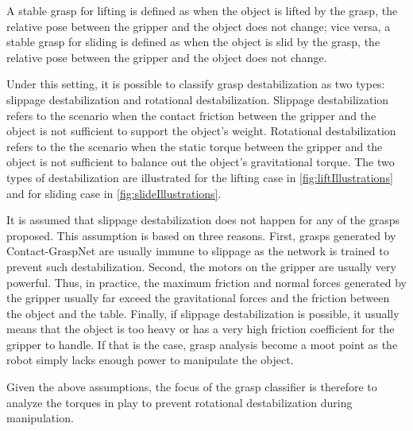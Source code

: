 \documentclass[12pt]{ucsddissertation}
\begin{document}
A stable grasp for lifting is defined as when the object is lifted by the grasp, the relative pose between the gripper and the object does not change; vice versa, a stable grasp for sliding is defined as when the object is slid by the grasp, the relative pose between the gripper and the object does not change. 

Under this setting, it is possible to classify grasp destabilization as two types: slippage destabilization and rotational destabilization. Slippage destabilization refers to the scenario when the contact friction between the gripper and the object is not sufficient to support the object's weight. Rotational destabilization refers to the the scenario when the static torque between the gripper and the object is not sufficient to balance out the object's gravitational torque. The two types of destabilization are illustrated for the lifting case in \ref{fig:liftIllustrations} and for sliding case in \ref{fig:slideIllustrations}. 

It is assumed that slippage destabilization does not happen for any of the grasps proposed. This assumption is based on three reasons. First, grasps generated by Contact-GraspNet are usually immune to slippage as the network is trained to prevent such destabilization. Second, the motors on the gripper are usually very powerful. Thus, in practice, the maximum friction and normal forces generated by the gripper usually far exceed the gravitational forces and the friction between the object and the table. Finally, if slippage destabilization is possible, it usually means that the object is too heavy or has a very high friction coefficient for the gripper to handle. If that is the case, grasp analysis become a moot point as the robot simply lacks enough power to manipulate the object.

Given the above assumptions, the focus of the grasp classifier is therefore to analyze the torques in play to prevent rotational destabilization during manipulation.
\end{document}
